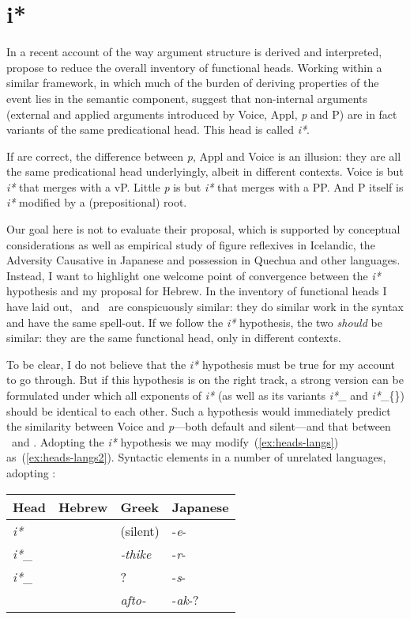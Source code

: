 \label{chap:i}
\section{i*}
In a recent account of the way argument structure is derived and interpreted, \cite{woodmarantz15} propose to reduce the overall inventory of functional heads. Working within a similar framework, in which much of the burden of deriving properties of the event lies in the semantic component, \citeauthor{woodmarantz15} suggest that non-internal arguments (external and applied arguments introduced by Voice, Appl, \emph{p} and P) are in fact variants of the same predicational head. This head is called \emph{i*}.

If \cite{woodmarantz15} are correct, the difference between \emph{p}, Appl and Voice is an illusion: they are all the same predicational head underlyingly, albeit in different contexts. Voice is but \emph{i*} that merges with a vP. Little \emph{p} is but \emph{i*} that merges with a PP. And P itself is \emph{i*} modified by a (prepositional) root.

Our goal here is not to evaluate their proposal, which is supported by conceptual considerations as well as empirical study of figure reflexives in Icelandic, the Adversity Causative in Japanese and possession in Quechua and other languages. Instead, I want to highlight one welcome point of convergence between the \emph{i*} hypothesis and my proposal for Hebrew. In the inventory of functional heads I have laid out, \vz~and \pz~are conspicuously similar: they do similar work in the syntax and have the same spell-out. If we follow the \emph{i*} hypothesis, the two \emph{should} be similar: they are the same functional head, only in different contexts.

To be clear, I do not believe that the \emph{i*} hypothesis must be true for my account to go through. But if this hypothesis is on the right track, a strong version can be formulated under which all exponents of \emph{i*} (as well as its variants \emph{i*}_{\text{\zero}} and \emph{i*}_{\{\}}) should be identical to each other. Such a hypothesis would immediately predict the similarity between Voice and \emph{p}---both default and silent---and that between \vz~and \pz. {Adopting the \emph{i*} hypothesis we may modify~(\ref{ex:heads-langs}) as~(\ref{ex:heads-langs2}).}
\ex\label{ex:heads-langs2}Syntactic elements in a number of unrelated languages, adopting \cite{woodmarantz15}:\\
	\begin{tabular}{l|lll}
	Head 		& Hebrew 		& Greek  		& Japanese\\\hline
	\emph{i*}   	& \tkal     & (silent)      & -\emph{e}-\\
	\emph{i*}_{\text{\zero}} 	& \tnif 	& \emph{-thike}	& -\emph{r}-\\
	\emph{i*}_{\text{\{D\}}}	& \thif		& ?		& -\emph{s}-\\
	{\va}	& \tpie		& \emph{afto-}	& -\emph{ak}-?\\
	\end{tabular}
\xe

